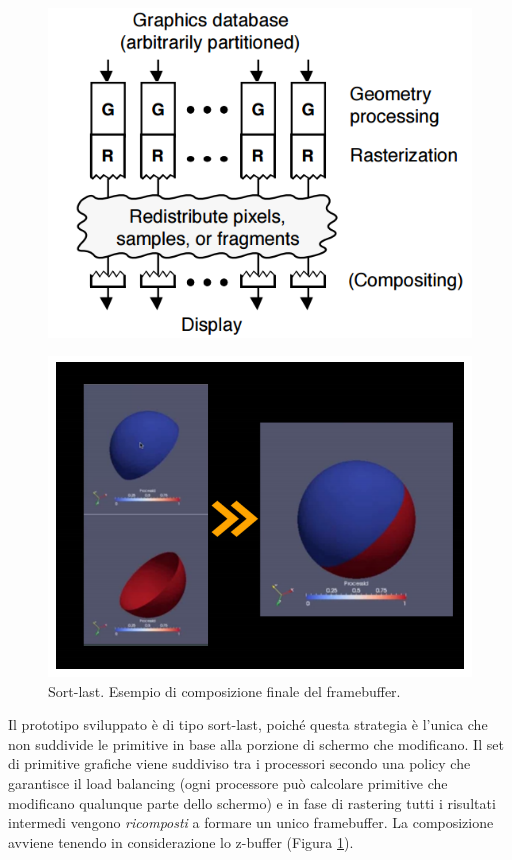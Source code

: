 \documentclass[a4paper,11pt]{paper}
\begin{document}
\begin{figure}
  \centering
  \begin{minipage}{0.4\textwidth}
    \includegraphics[scale=0.28]{sortlatst}
    \label{fig:sf}
  \end{minipage}
  \hfill
  \begin{minipage}{0.5\textwidth}
    \includegraphics[scale=0.28]{sortlastex}
  \end{minipage}
    \caption{Sort-last. Esempio di composizione finale del framebuffer.}\label{fig:sl}
\end{figure}

Il prototipo sviluppato è di tipo sort-last, poiché questa strategia è l'unica che non suddivide le primitive in base alla porzione di schermo che modificano.
Il set di primitive grafiche viene suddiviso tra i processori secondo una policy che garantisce il load balancing (ogni processore può calcolare primitive che modificano qualunque parte dello schermo) e in fase di rastering tutti i risultati intermedi vengono \textit{ricomposti} a formare un unico framebuffer. La composizione avviene tenendo in considerazione lo z-buffer (Figura \ref{fig:sl}).
\end{document}
